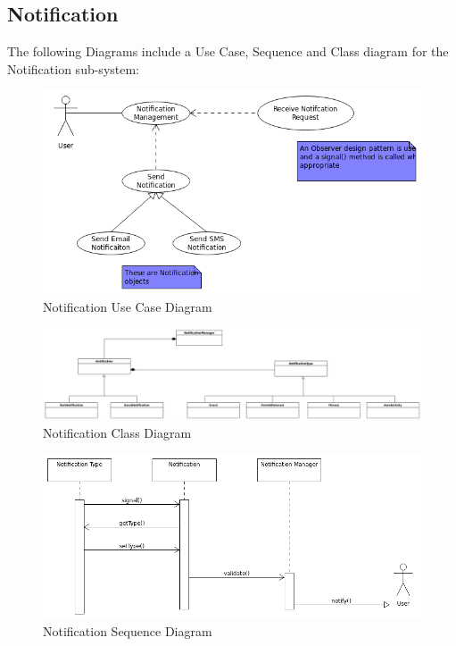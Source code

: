 \documentclass{article}
\begin{document}
	\subsection{Notification}
	The following Diagrams include a Use Case, Sequence and Class diagram for the Notification sub-system:
	\FloatBarrier	
	\begin{figure}[h]
		\caption{Notification Use Case Diagram}
  		\includegraphics[width=\textwidth]{Images/NotificationUseCase.png}
	\end{figure}
	\begin{figure}
		\caption{Notification Class Diagram}
  		\includegraphics[width=\textwidth]{Images/NotificationClass.png}
	\end{figure}
	\begin{figure}[h]
		\caption{Notification Sequence Diagram}
  		\includegraphics[width=\textwidth]{Images/NotificationSequence.png}
	\end{figure}
	\FloatBarrier	
\end{document}
